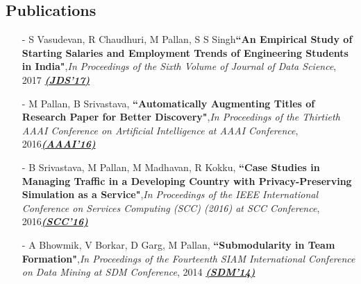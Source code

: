 \documentclass[margin,line]{res}
\begin{document}
\begin{resume}
\section{\sc Publications}
\begin{itemize}
\item[-]S Vasudevan, R Chaudhuri, M Pallan, S S Singh{\bf ``An Empirical Study of Starting Salaries and Employment Trends of Engineering Students in India"},{\em In Proceedings of the Sixth Volume of Journal of Data Science}, 2017 {\bf \href{http://epubs.siam.org/doi/pdf/10.1137/1.9781611973440.102}{\em (JDS'17)}}

\item[-] M Pallan, B Srivastava, {\bf ``Automatically Augmenting Titles of Research Paper for Better Discovery"},{\em In Proceedings of the Thirtieth AAAI Conference on Artificial Intelligence at AAAI Conference}, 2016{\bf \href{https://www.aaai.org/ocs/index.php/WS/AAAIW16/paper/view/12578/12441}{\em (AAAI'16)}}

\item[-] B Srivastava, M Pallan, M Madhavan, R Kokku, {\bf ``Case Studies in Managing Traffic in a Developing Country with Privacy-Preserving Simulation as a Service"},{\em In Proceedings of the IEEE International Conference on Services Computing (SCC) (2016) at SCC Conference}, 2016{\bf \href{https://www.computer.org/csdl/proceedings/scc/2016/2628/00/2628a766-abs.html}{\em (SCC'16)}}

\item[-] A Bhowmik, V Borkar, D Garg, M Pallan, {\bf ``Submodularity in Team Formation"},{\em In Proceedings of the Fourteenth SIAM International Conference on Data Mining at SDM Conference}, 2014 {\bf \href{http://epubs.siam.org/doi/pdf/10.1137/1.9781611973440.102}{\em (SDM'14)}}





\end{itemize}
\end{resume}
\end{document}
